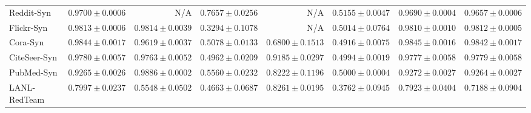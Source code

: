 \documentclass[11pt,a4paper]{article}
\begin{document}
\begin{table}[H]
\begin{tabular*}{\textwidth}{@{\extracolsep{\fill}}lrrrrrrr}
Reddit-Syn & $\mathbf{0.9700 \pm 0.0006}$ & N/A & $0.7657 \pm 0.0256$ & N/A & $0.5155 \pm 0.0047$ & $0.9690 \pm 0.0004$ & $0.9657 \pm 0.0006$ \\
Flickr-Syn & $0.9813 \pm 0.0006$ & $\mathbf{0.9814 \pm 0.0039}$ & $0.3294 \pm 0.1078$ & N/A & $0.5014 \pm 0.0764$ & $0.9810 \pm 0.0010$ & $0.9812 \pm 0.0005$ \\
Cora-Syn & $0.9844 \pm 0.0017$ & $0.9619 \pm 0.0037$ & $0.5078 \pm 0.0133$ & $0.6800 \pm 0.1513$ & $0.4916 \pm 0.0075$ & $\mathbf{0.9845 \pm 0.0016}$ & $0.9842 \pm 0.0017$ \\
CiteSeer-Syn & $\mathbf{0.9780 \pm 0.0057}$ & $0.9763 \pm 0.0052$ & $0.4962 \pm 0.0209$ & $0.9185 \pm 0.0297$ & $0.4994 \pm 0.0019$ & $0.9777 \pm 0.0058$ & $0.9779 \pm 0.0058$ \\
PubMed-Syn & $0.9265 \pm 0.0026$ & $\mathbf{0.9886 \pm 0.0002}$ & $0.5560 \pm 0.0232$ & $0.8222 \pm 0.1196$ & $0.5000 \pm 0.0004$ & $0.9272 \pm 0.0027$ & $0.9264 \pm 0.0027$ \\\midrule
LANL-RedTeam & $0.7997 \pm 0.0237$ & $0.5548 \pm 0.0502$ & $0.4663 \pm 0.0687$ & $\mathbf{0.8261 \pm 0.0195}$ & $0.3762 \pm 0.0945$ & $0.7923 \pm 0.0404$ & $0.7188 \pm 0.0904$ \\\bottomrule
\end{tabular*}
\end{table}
\end{document}
